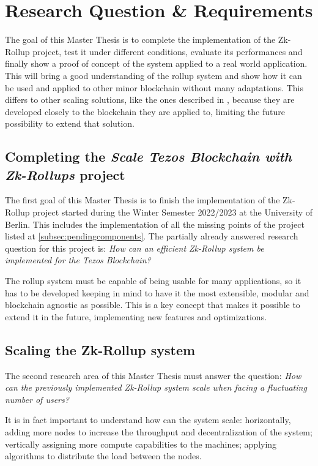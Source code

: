 \chapter{Research Question \& Requirements\label{cha:chapter3}}
The goal of this Master Thesis is to complete the implementation of the Zk-Rollup project, test it under different conditions, evaluate its performances and finally show a proof of concept of the system applied to a real world application. This will bring a good understanding of the rollup system and show how it can be used and applied to other minor blockchain without many adaptations. This differs to other scaling solutions, like the ones described in \cite{yang_review_2020}, because they are developed closely to the blockchain they are applied to, limiting the future possibility to extend that solution.

\section{Completing the \textit{Scale Tezos Blockchain with Zk-Rollups} project}
The first goal of this Master Thesis is to finish the implementation of the Zk-Rollup project started during the Winter Semester 2022/2023 at the University of Berlin. This includes the implementation of all the missing points of the project listed at \ref{subsec:pendingcomponents}. The partially already answered research question for this project is: \textit{How can an efficient Zk-Rollup system be implemented for the Tezos Blockchain?}

The rollup system must be capable of being usable for many applications, so it has to be developed keeping in mind to have it the most extensible, modular and blockchain agnostic as possible. This is a key concept that makes it possible to extend it in the future, implementing new features and optimizations.

\section{Scaling the Zk-Rollup system}
The second research area of this Master Thesis must answer the question: \textit{How can the previously implemented  Zk-Rollup system scale when facing a fluctuating number of users?}

It is in fact important to understand how can the system scale: horizontally, adding more nodes to increase the throughput and decentralization of the system; vertically assigning more compute capabilities to the machines; applying algorithms to distribute the load between the nodes.

